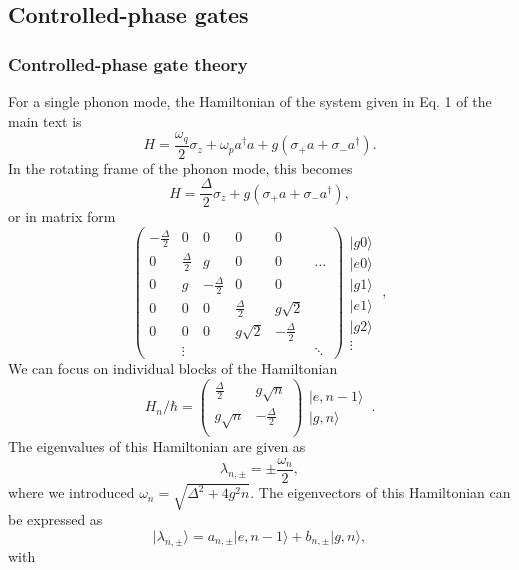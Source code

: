 \documentclass[12pt]{article}
\newcommand{\ket}[1]{\ensuremath{|{#1}\rangle}}
\begin{document}
\subsection{Controlled-phase gates}

\subsubsection{Controlled-phase gate theory}
For a single phonon mode, the Hamiltonian of the system given in Eq. 1 of the main text is
\begin{equation}
H = \frac{\omega_q}{2} \sigma_z + \omega_p a^{\dagger} a + g \left( \sigma_+ a + \sigma_- a^{\dagger}\right).
\end{equation}
In the rotating frame of the phonon mode, this becomes
\begin{equation}
H = \frac{\Delta}{2} \sigma_z + g \left( \sigma_+ a + \sigma_- a^{\dagger}\right),
\end{equation}
or in matrix form
\begin{equation}
\begin{pmatrix}
-\frac{\Delta}{2} & 0&0 &0 & 0& \\
0& \frac{\Delta}{2} & g & 0&0 & \hdots\\
0& g & -\frac{\Delta}{2} &0 &0 & \\
0& 0& 0& \frac{\Delta}{2} & g \sqrt{2} & \\
0&0 & 0& g \sqrt{2} & -\frac{\Delta}{2} & \\
& \vdots & & & & \ddots
\end{pmatrix}
\begin{matrix}
     \ket{g0}\\
     \ket{e0}\\
     \ket{g1}\\
     \ket{e1}\\
     \ket{g2}\\
     \vdots
\end{matrix} \;,
\end{equation}
We can focus on individual blocks of the Hamiltonian
\begin{equation}
H_n/\hbar = \begin{pmatrix}
\frac{\Delta}{2} & g \sqrt{n} \\
g \sqrt{n} & -\frac{\Delta}{2} \\
\end{pmatrix}
\begin{matrix}
    \ket{e, n-1}\\
    \ket{g, n}
\end{matrix}\,.
\end{equation}
The eigenvalues of this Hamiltonian are given as
\begin{equation}
\lambda_{n,\pm} = \pm \frac{\omega_n}{2},
\end{equation}
where  we introduced $\omega_n = \sqrt{\Delta^2+4g^2n}$. \newline
The eigenvectors of this Hamiltonian can be expressed as
\begin{equation}
\label{new_eigenbasis}
\ket{\lambda_{n,\pm}} = a_{n,\pm} \ket{e, n-1} + b_{n,\pm} \ket{g, n},
\end{equation}
with
\end{document}
